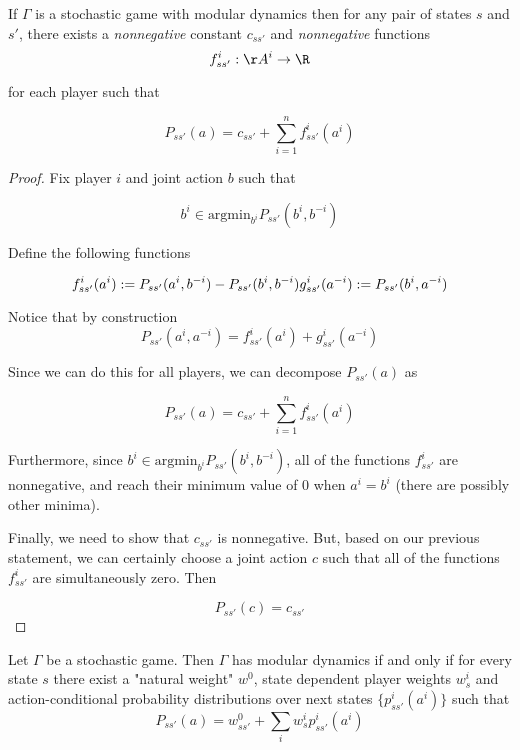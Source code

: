 \begin{lem}
If $\Gamma$ is a stochastic game with modular dynamics then for any pair of states $s$ and $s'$, there exists a {\em nonnegative} constant $c_{ss'}$ and {\em nonnegative} functions
$$
f^i_{ss'} : \AA^i \rightarrow \R
$$

for each player such that

$$
P_{ss'}(a) = c_{ss'} + \sum_{i=1}^n f^i_{ss'}(a^i)
$$
\end{lem}

\begin{proof}

Fix player $i$ and joint action $b$ such that

$$
b^i \in \text{argmin}_{b^i} P_{ss'}(b^i, b^{-i})
$$

Define the following functions

$$
f^i_{ss'}(a^i) := P_{ss'}(a^i, b^{-i}) - P_{ss'}(b^i, b^{-i}) \\
g^i_{ss'}(a^{-i}) := P_{ss'}(b^i, a^{-i})
$$

Notice that by construction 
$$
P_{ss'}(a^i, a^{-i}) = f^i_{ss'}(a^i) + g^i_{ss'}(a^{-i})
$$

Since we can do this for all players, we can decompose $P_{ss'}(a)$ as

$$
P_{ss'}(a) = c_{ss'} + \sum_{i=1}^n f^i_{ss'}(a^i)
$$

Furthermore, since $b^i \in \text{argmin}_{b^i} P_{ss'}(b^i, b^{-i})$, all of the functions $f^i_{ss'}$ are nonnegative, and reach their minimum value of $0$ when $a^i = b^i$ (there are possibly other minima).

Finally, we need to show that $c_{ss'}$ is nonnegative. But, based on our previous statement, we can certainly choose a joint action $c$ such that all of the functions $f^i_{ss'}$ are simultaneously zero. Then

$$
P_{ss'}(c) = c_{ss'}
$$
\end{proof}




\begin{thm}
Let $\Gamma$ be a stochastic game. Then $\Gamma$ has modular dynamics if and only if for every state $s$ there exist a "natural weight" $w^0$, state dependent player weights $w^i_s$ and action-conditional probability distributions over next states $\{p^i_{ss'}(a^i) \}$ such that
$$
P_{ss'}(a) = w_{ss'}^0 + \sum_{i} w^i_s p^i_{ss'}(a^i)
$$
\end{thm}

